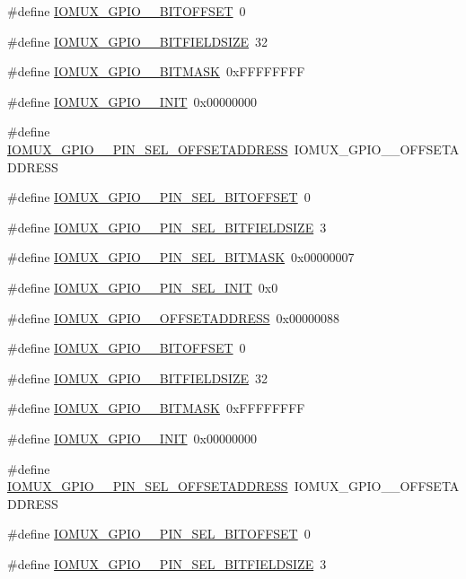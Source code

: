 \begin{DoxyCompactItemize}
\#define \hyperlink{a00560_a4a329dd3f164ca8f6a863ffc8ec65821}{IOMUX\_\-GPIO\_\_\-BITOFFSET}~0
\item 
\#define \hyperlink{a00560_ac7e60aed976a1a4ff9c4c4cc24f4aa11}{IOMUX\_\-GPIO\_\_\-BITFIELDSIZE}~32
\item 
\#define \hyperlink{a00560_a27ae6315cdfa8534b75bc164c5832014}{IOMUX\_\-GPIO\_\_\-BITMASK}~0xFFFFFFFF
\item 
\#define \hyperlink{a00560_a7c525b5c7bf2e2c54e6ee41607c3d26a}{IOMUX\_\-GPIO\_\_\-INIT}~0x00000000
\item 
\#define \hyperlink{a00560_a9fdfc69f64ec6d9fe747de07e8caf125}{IOMUX\_\-GPIO\_\_\-PIN\_\-SEL\_\-OFFSETADDRESS}~IOMUX\_\-GPIO\_\_\-OFFSETADDRESS
\item 
\#define \hyperlink{a00560_a847bdf0052a00c6368b9980c425d13c7}{IOMUX\_\-GPIO\_\_\-PIN\_\-SEL\_\-BITOFFSET}~0
\item 
\#define \hyperlink{a00560_a6af41bb34ef84d866334899bbeac19ad}{IOMUX\_\-GPIO\_\_\-PIN\_\-SEL\_\-BITFIELDSIZE}~3
\item 
\#define \hyperlink{a00560_a691bd4dc732b9611067e9c13b8dc366e}{IOMUX\_\-GPIO\_\_\-PIN\_\-SEL\_\-BITMASK}~0x00000007
\item 
\#define \hyperlink{a00560_ab151f07b5a0dcb6efcacc3972c00d59f}{IOMUX\_\-GPIO\_\_\-PIN\_\-SEL\_\-INIT}~0x0
\item 
\#define \hyperlink{a00560_ab50fdae060d12f4a03dbbed1dbabb2b8}{IOMUX\_\-GPIO\_\_\-OFFSETADDRESS}~0x00000088
\item 
\#define \hyperlink{a00560_a1b6e035f934ded8626fa2353f789e0d1}{IOMUX\_\-GPIO\_\_\-BITOFFSET}~0
\item 
\#define \hyperlink{a00560_a0852084454fffd77784db3990fe7e755}{IOMUX\_\-GPIO\_\_\-BITFIELDSIZE}~32
\item 
\#define \hyperlink{a00560_a4d11c6980cf8d6ccc65abb77d788046f}{IOMUX\_\-GPIO\_\_\-BITMASK}~0xFFFFFFFF
\item 
\#define \hyperlink{a00560_a85a6aebc73ef23456b0a9d41128248d1}{IOMUX\_\-GPIO\_\_\-INIT}~0x00000000
\item 
\#define \hyperlink{a00560_a37df2f58f46602430410a8ff23e147d5}{IOMUX\_\-GPIO\_\_\-PIN\_\-SEL\_\-OFFSETADDRESS}~IOMUX\_\-GPIO\_\_\-OFFSETADDRESS
\item 
\#define \hyperlink{a00560_af4059ebdc2da7c6232b692176229d140}{IOMUX\_\-GPIO\_\_\-PIN\_\-SEL\_\-BITOFFSET}~0
\item 
\#define \hyperlink{a00560_a3894ab3940fc9912b785e49c366ea47e}{IOMUX\_\-GPIO\_\_\-PIN\_\-SEL\_\-BITFIELDSIZE}~3

\end{DoxyCompactItemize}
